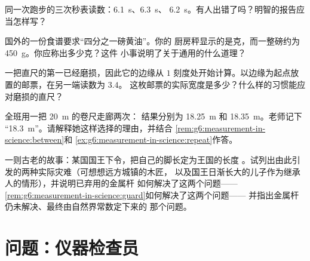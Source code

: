 \begin{exercise}[$\star$]\label{exo:g6:measurement-in-science:8}
同一次跑步的三次秒表读数：\qty{6.1}{s}、\qty{6.3}{s}、
\qty{6.2}{s}。有人出错了吗？明智的报告应当怎样写？
\end{exercise}

\begin{exercise}[$\star\star$]\label{exo:g6:measurement-in-science:9}
国外的一份食谱要求“四分之一磅黄油”。你的
厨房秤显示的是克，而一整磅约为
\qty{450}{g}。你应称出多少克？这件
小事说明了关于通用的什么道理？
\end{exercise}

\begin{exercise}[$\star\star$]\label{exo:g6:measurement-in-science:10}
一把直尺的第一已经磨损，因此它的边缘从
$1$ 刻度处开始计算。以边缘为起点放置的邮票，在另一端读数为 $3.4$。
这枚邮票的实际宽度是多少？什么样的习惯能应对磨损的直尺？
\end{exercise}

\begin{exercise}[$\star\star$]\label{exo:g6:measurement-in-science:11}
全班用一把 \qty{20}{m} 的卷尺走廊两次：
结果分别为 \qty{18.25}{m} 和 \qty{18.35}{m}。老师记下
“\qty{18.3}{m}”。请解释她这样选择的理由，并结合
\cref{rem:g6:measurement-in-science:between}和
\cref{ex:g6:measurement-in-science:repeat}作答。
\end{exercise}

\begin{exercise}[$\star\star\star$]\label{exo:g6:measurement-in-science:12}
一则古老的故事：某国国王下令，把自己的脚长定为王国的长度
。试列出由此引发的两种实际灾难（可想想远方城镇的木匠，
以及国王日渐长大的儿子作为继承人的情形），并说明已弃用的金属杆
如何解决了这两个问题——
\cref{rem:g6:measurement-in-science:guard}如何解决了这两个问题——
并指出金属杆仍未解决、最终由自然界常数定下来的
那个问题。
\end{exercise}

\section{问题：仪器检查员}


